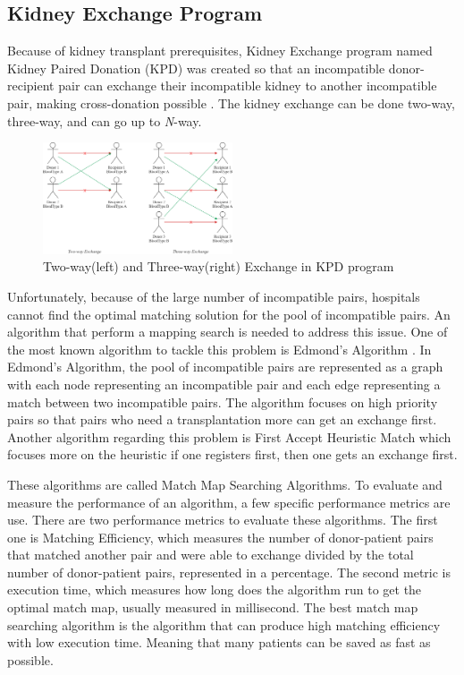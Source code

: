 \documentclass[conference]{IEEEtran}
\begin{document}
\subsection{Kidney Exchange Program}
Because of kidney transplant prerequisites, Kidney Exchange program named Kidney Paired Donation (KPD) was created
so that an incompatible donor-recipient pair can exchange their incompatible kidney to another incompatible
pair, making cross-donation possible \cite{raja}. The kidney exchange can be done two-way, three-way, and can
go up to \textit{N}-way.

\begin{figure}[h]
    \includegraphics[width=0.5\textwidth]{images/kidney-exchange.png}
    \caption{Two-way(left) and Three-way(right) Exchange in KPD program}
\end{figure}

Unfortunately, because of the large number of incompatible pairs, hospitals cannot find the optimal
matching solution for the pool of incompatible pairs. An algorithm that perform a mapping search is needed
to address this issue. One of the most known algorithm to tackle this problem is Edmond's Algorithm \cite{raja}.
In Edmond's Algorithm, the pool of incompatible pairs are represented as a graph with each node representing
an incompatible pair and each edge representing a match between two incompatible pairs. The algorithm focuses on
high priority pairs so that pairs who need a transplantation more can get an exchange first.
Another algorithm regarding this problem is First Accept Heuristic Match \cite{raja} which focuses more on the
heuristic if one registers first, then one gets an exchange first.

These algorithms are called Match Map Searching Algorithms. To evaluate and measure the performance of an algorithm,
a few specific performance metrics are use\cite{tullis}. There are two performance metrics to evaluate these
algorithms. The first one is Matching Efficiency, which measures the number of donor-patient pairs that matched
another pair and were able to exchange divided by the total number of donor-patient pairs, represented in a percentage.
The second metric is execution time, which measures how long does the algorithm run to get the optimal match map,
usually measured in millisecond. The best match map searching algorithm is the algorithm that can produce high matching
efficiency with low execution time. Meaning that many patients can be saved as fast as possible.
\end{document}
